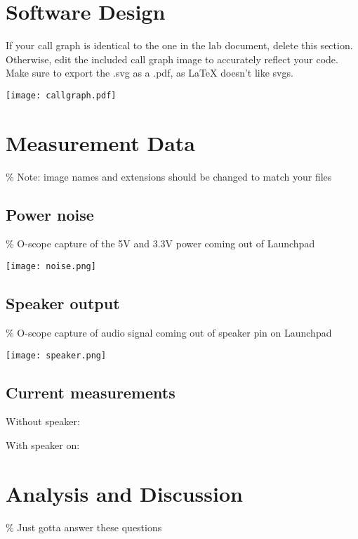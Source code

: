 \documentclass{article}
\begin{document}
\section{Software Design}

	If your call graph is identical to the one in the lab document, delete this
	section. Otherwise, edit the included call graph image to accurately reflect
	your code. Make sure to export the .svg as a .pdf, as LaTeX doesn't like
	svgs.

	\texttt{[image: callgraph.pdf]}

\section{Measurement Data}
\% Note: image names and extensions should be changed to match your files

\subsection{Power noise} \% O-scope capture of the 5V and 3.3V power coming out of Launchpad
	
	\texttt{[image: noise.png]} 

\subsection{Speaker output} \% O-scope capture of audio signal coming out of speaker pin on Launchpad
	
	\texttt{[image: speaker.png]}

\subsection{Current measurements}
	
Without speaker:

With speaker on:

\section{Analysis and Discussion} \% Just gotta answer these questions
\end{document}
